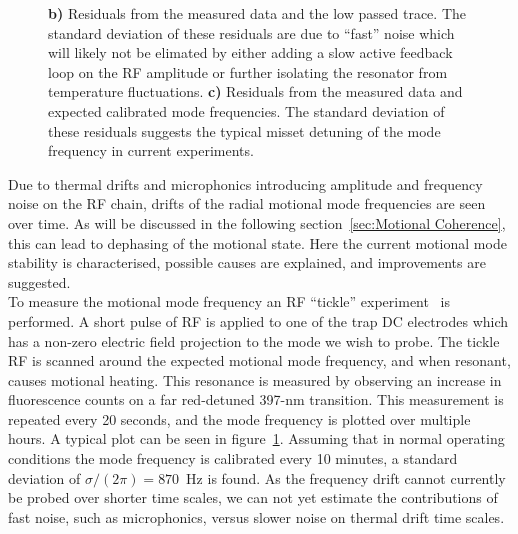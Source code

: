 \begin{figure}
{            \textbf{b)} Residuals from the measured data and the low passed trace. The standard deviation of these residuals are due to ``fast'' noise which will likely not be elimated by either adding a slow active feedback loop on the RF amplitude or further isolating the resonator from temperature fluctuations. 
            \textbf{c)} Residuals from the measured data and expected calibrated mode frequencies. The standard deviation of these residuals suggests the typical misset detuning of the mode frequency in current experiments.
            }
        \label{fig:mode drift}
    \end{figure}

    Due to thermal drifts and microphonics introducing amplitude and frequency noise on the RF chain, drifts of the radial motional mode frequencies are seen over time. As will be discussed in the following section~\ref{sec:Motional Coherence}, this can lead to dephasing of the motional state. Here the current motional mode stability is characterised, possible causes are explained, and improvements are suggested. \\
    To measure the motional mode frequency an RF ``tickle'' experiment~\cite{} is performed. A short pulse of RF is applied to one of the trap DC electrodes which has a non-zero electric field projection to the mode we wish to probe. The tickle RF is scanned around the expected motional mode frequency, and when resonant, causes motional heating. This resonance is measured by observing an increase in fluorescence counts on a far red-detuned 397-nm transition. This measurement is repeated every 20 seconds, and the mode frequency is plotted over multiple hours. A typical plot can be seen in figure~\ref{fig:mode drift}.  Assuming that in normal operating conditions the mode frequency is calibrated every 10 minutes, a standard deviation of $\sigma/(2\pi) = 870$~Hz is found. As the frequency drift cannot currently be probed over shorter time scales, we can not yet estimate the contributions of fast noise, such as microphonics, versus slower noise on thermal drift time scales. 
    
    

